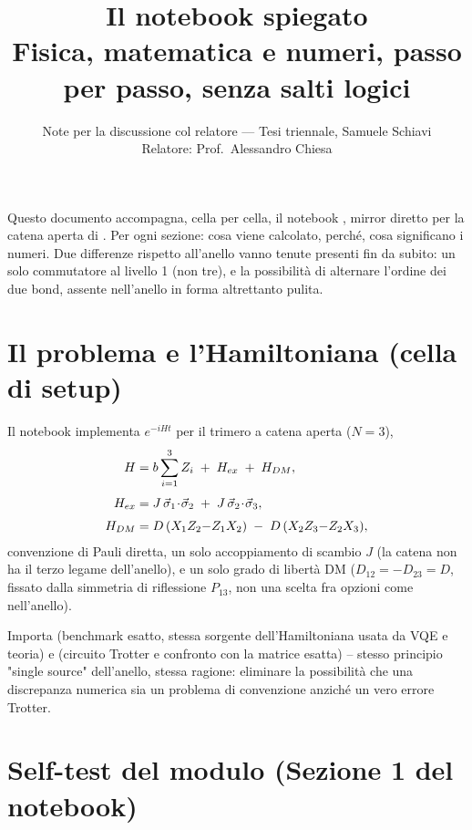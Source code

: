 \documentclass[11pt,a4paper]{article}
\title{Il notebook \texttt{\seqsplit{quantum\_simulation\_trimero\_catena\_trotter.ipynb}} spiegato\\
\large Fisica, matematica e numeri, passo per passo, senza salti logici}
\author{Note per la discussione col relatore --- Tesi triennale, Samuele Schiavi\\ Relatore: Prof.\ Alessandro Chiesa}
\date{}
\begin{document}
\maketitle
\tableofcontents

\bigskip
\noindent Questo documento accompagna, cella per cella, il notebook
\texttt{}, mirror
diretto per la catena aperta di
\texttt{}.
Per ogni sezione: cosa viene calcolato, perché, cosa significano i numeri.
Due differenze rispetto all'anello vanno tenute presenti fin da subito: un
solo commutatore al livello 1 (non tre), e la possibilità di alternare
l'ordine dei due bond, assente nell'anello in forma altrettanto pulita.

\section{Il problema e l'Hamiltoniana (cella di setup)}

Il notebook implementa $e^{-iHt}$ per il trimero a catena aperta ($N=3$),
\begin{align}
H &= b\sum_{i=1}^3 Z_i \;+\; H_{ex} \;+\; H_{DM}, \label{eq:H-full}\\[3pt]
H_{ex} &= J\,\vec\sigma_1\!\cdot\!\vec\sigma_2 \;+\; J\,\vec\sigma_2\!\cdot\!\vec\sigma_3, \notag\\[3pt]
H_{DM} &= D\,(X_1Z_2{-}Z_1X_2) \;-\; D\,(X_2Z_3{-}Z_2X_3), \notag
\end{align}
convenzione di Pauli diretta, un solo accoppiamento di scambio $J$ (la
catena non ha il terzo legame dell'anello), e un solo grado di libertà DM
($D_{12}=-D_{23}=D$, fissato dalla simmetria di riflessione $P_{13}$, non
una scelta fra opzioni come nell'anello).

Importa \texttt{} (benchmark esatto, stessa
sorgente dell'Hamiltoniana usata da VQE e teoria) e
\texttt{} (circuito Trotter e confronto
con la matrice esatta) -- stesso principio "single source" dell'anello,
stessa ragione: eliminare la possibilità che una discrepanza numerica sia
un problema di convenzione anziché un vero errore Trotter.

\section{Self-test del modulo (Sezione 1 del notebook)}
\label{sec:self-test}
\end{document}
